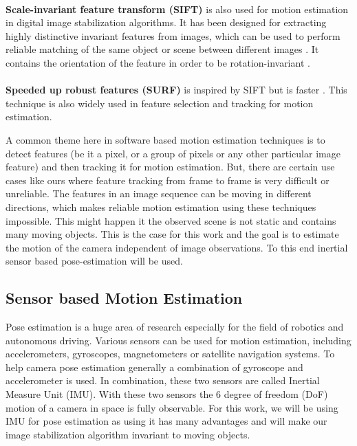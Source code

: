 \paragraph{}\textbf{Scale-invariant feature transform (SIFT)} is also used for motion estimation in digital image stabilization algorithms.  It has been designed for extracting highly distinctive invariant features from images, which can be used to perform reliable matching of the same object or scene between different images \citep{battiato2007sift}. It contains the orientation of the feature in order to be rotation-invariant \citep{dis_review}.

\paragraph{}\textbf{Speeded up robust features (SURF)} is inspired by SIFT but is faster \citep{dis_surf}. This technique is also widely used in feature selection and tracking for motion estimation.

A common theme here in software based motion estimation techniques is to detect features (be it a pixel, or a group of pixels or any other particular image feature) and then tracking it for motion estimation. But, there are certain use cases like ours where feature tracking from frame to frame is very difficult or unreliable. The features in an image sequence can be moving in different directions, which makes reliable motion estimation using these techniques impossible. This might happen it the observed scene is not static and contains many moving objects. This is the case for this work and the goal is to estimate the motion of the camera independent of image observations. To this end inertial sensor based pose-estimation will be used.

\subsection{Sensor based Motion Estimation}
Pose estimation is a huge area of research especially for the field of robotics and autonomous driving. Various sensors can be used for motion estimation, including accelerometers, gyroscopes, magnetometers or satellite navigation systems. To help camera pose estimation generally a combination of gyroscope and accelerometer is used. In combination, these two sensors are called Inertial Measure Unit (IMU). With these two sensors the 6 degree of freedom (DoF) motion of a camera in space is fully observable. For this work, we will be using IMU for pose estimation as using it has many advantages and will make our image stabilization algorithm invariant to moving objects.

